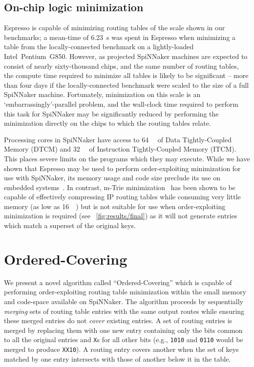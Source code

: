 \documentclass[conference]{IEEEtran}
\newcommand{\mytt}[1]{\texttt{\footnotesize#1}}
\begin{document}
\subsection{On-chip logic minimization}

Espresso is capable of minimizing routing tables of the scale shown in our benchmarks; a mean-time of \SI{6.23}{\second} was spent in Espresso when minimizing a table from the locally-connected benchmark on a lightly-loaded Intel~Pentium~G850.
However, as projected SpiNNaker machines are expected to consist of nearly sixty-thousand chips, and the same number of routing tables, the  compute time required to minimize all tables is likely to be significant -- more than four days if the locally-connected benchmark were scaled to the size of a full SpiNNaker machine.
Fortunately, minimization on this scale is an `embarrassingly'-parallel problem, and the wall-clock time required to perform this task for SpiNNaker may be significantly reduced by performing the minimization directly on the chips to which the routing tables relate.

Processing cores in SpiNNaker have access to \SI{64}{\kibi\byte} of Data Tightly-Coupled Memory (DTCM) and \SI{32}{\kibi\byte} of Instruction Tightly-Coupled Memory (ITCM).
This places severe limits on the programs which they may execute.
While we have shown that Espresso may be used to perform order-exploiting minimization for use with SpiNNaker, its memory usage and code size preclude its use on embedded systems~\parencite{Lysecky2003}.
In contrast, m-Trie minimization~\parencite{Ahmad2007} has been shown to be capable of effectively compressing IP routing tables while consuming very little memory (as low as \SI{16}{\kibi\byte}) but is not suitable for use when order-exploiting minimization is required (see \figurename~\ref{fig:results/final}) as it will not generate entries which match a superset of the original keys.

\section{Ordered-Covering}

  We present a novel algorithm called ``Ordered-Covering'' which is capable of performing order-exploiting routing table minimization within the small memory and code-space available on SpiNNaker.
  The algorithm proceeds by sequentially \textit{merging} sets of routing table entries with the same output routes while ensuring these merged entries do not \textit{cover} existing entries. 
  A set of routing entries is merged by replacing them with one new entry containing only the bits common to all the original entries and \mytt{X}s for all other bits
  (e.g., \mytt{1010} and \mytt{0110} would be merged to produce \mytt{XX10}).
  A routing entry covers another when the set of keys matched by one entry intersects with those of another below it in the table.
\end{document}
